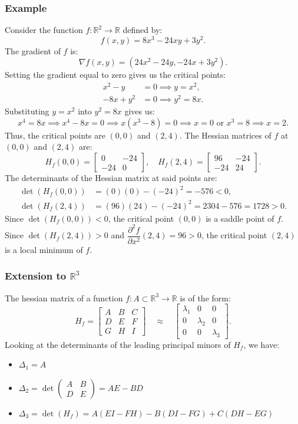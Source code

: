 \documentclass[11pt]{article}
\begin{document}
\subsubsection*{Example}
Consider the function \(f : \mathbb{R}^2 \to \mathbb{R}\) defined by:
\[f(x, y) = 8x^3 - 24xy + 3y^2.\]
The gradient of \(f\) is:
\[\nabla f(x, y) = (24x^2 - 24y, -24x + 3y^2).\]
Setting the gradient equal to zero gives us the critical points:
\begin{align*}
x^2 - y & = 0 \implies y = x^2, \\
-8x + y^2 & = 0 \implies y^2 = 8x.
\end{align*}
Substituting \(y = x^2\) into \(y^2 = 8x\) gives us:
\[x^4 = 8x \implies x^4 - 8x = 0 \implies x(x^3 - 8) = 0 \implies x = 0 \text{ or } x^3 = 8 \implies x = 2.\]
Thus, the critical points are \((0, 0)\) and \((2, 4)\). The Hessian matrices of \(f\) at \((0, 0)\) and \((2, 4)\) are:
\[H_f(0, 0) = \begin{bmatrix}
0 & -24 \\
-24 & 0
\end{bmatrix}, \quad H_f(2, 4) = \begin{bmatrix}
96 & -24 \\
-24 & 24
\end{bmatrix}.\]
The determinants of the Hessian matrix at said points are:
\begin{align*}
\det(H_f(0, 0)) & = (0)(0) - (-24)^2 = -576 < 0, \\
\det(H_f(2, 4)) & = (96)(24) - (-24)^2 = 2304 - 576 = 1728 > 0.
\end{align*}
Since \(\det(H_f(0, 0)) < 0\), the critical point \((0, 0)\) is a saddle point of \(f\). Since \(\det(H_f(2, 4)) > 0\) and \(\dfrac{\partial^2 f}{\partial x^2}(2, 4) = 96 > 0\), the critical point \((2, 4)\) is a local minimum of \(f\).

\subsubsection{Extension to \(\mathbb{R}^3\)}
The hessian matrix of a function \(f : A \subset \mathbb{R}^3 \to \mathbb{R}\) is of the form:
\[H_f = \begin{bmatrix}
    A & B & C \\
    D & E & F \\
    G & H & I
\end{bmatrix} \quad \approx \quad \begin{bmatrix}
\lambda_1 & 0 & 0 \\
0 & \lambda_2 & 0 \\
0 & 0 & \lambda_3
\end{bmatrix}.\]
Looking at the determinants of the leading principal minors of \(H_f\), we have:
\begin{itemize}
    \item \(\Delta_1 = A\)
    \item \(\Delta_2 = \det \begin{pmatrix}
    A & B \\
    D & E
    \end{pmatrix} = AE - BD\)
    \item \(\Delta_3 = \det(H_f) = A(EI - FH) - B(DI - FG) + C(DH - EG)\)
\end{itemize}
\end{document}
